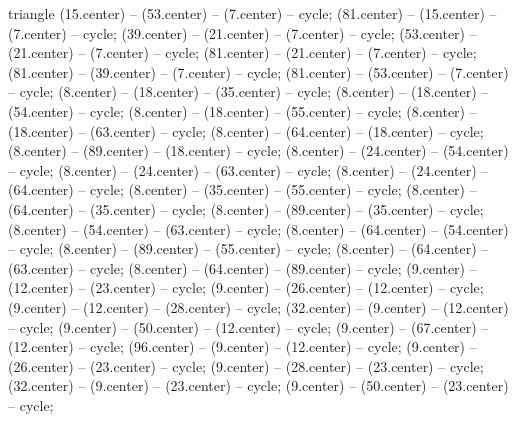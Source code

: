 \begin{pgfonlayer}{triangle}
 (15.center) -- (53.center) -- (7.center) -- cycle; 
 (81.center) -- (15.center) -- (7.center) -- cycle; 
 (39.center) -- (21.center) -- (7.center) -- cycle; 
 (53.center) -- (21.center) -- (7.center) -- cycle; 
 (81.center) -- (21.center) -- (7.center) -- cycle; 
 (81.center) -- (39.center) -- (7.center) -- cycle; 
 (81.center) -- (53.center) -- (7.center) -- cycle; 
 (8.center) -- (18.center) -- (35.center) -- cycle; 
 (8.center) -- (18.center) -- (54.center) -- cycle; 
 (8.center) -- (18.center) -- (55.center) -- cycle; 
 (8.center) -- (18.center) -- (63.center) -- cycle; 
 (8.center) -- (64.center) -- (18.center) -- cycle; 
 (8.center) -- (89.center) -- (18.center) -- cycle; 
 (8.center) -- (24.center) -- (54.center) -- cycle; 
 (8.center) -- (24.center) -- (63.center) -- cycle; 
 (8.center) -- (24.center) -- (64.center) -- cycle; 
 (8.center) -- (35.center) -- (55.center) -- cycle; 
 (8.center) -- (64.center) -- (35.center) -- cycle; 
 (8.center) -- (89.center) -- (35.center) -- cycle; 
 (8.center) -- (54.center) -- (63.center) -- cycle; 
 (8.center) -- (64.center) -- (54.center) -- cycle; 
 (8.center) -- (89.center) -- (55.center) -- cycle; 
 (8.center) -- (64.center) -- (63.center) -- cycle; 
 (8.center) -- (64.center) -- (89.center) -- cycle; 
 (9.center) -- (12.center) -- (23.center) -- cycle; 
 (9.center) -- (26.center) -- (12.center) -- cycle; 
 (9.center) -- (12.center) -- (28.center) -- cycle; 
 (32.center) -- (9.center) -- (12.center) -- cycle; 
 (9.center) -- (50.center) -- (12.center) -- cycle; 
 (9.center) -- (67.center) -- (12.center) -- cycle; 
 (96.center) -- (9.center) -- (12.center) -- cycle; 
 (9.center) -- (26.center) -- (23.center) -- cycle; 
 (9.center) -- (28.center) -- (23.center) -- cycle; 
 (32.center) -- (9.center) -- (23.center) -- cycle; 
 (9.center) -- (50.center) -- (23.center) -- cycle; 

\end{pgfonlayer}
